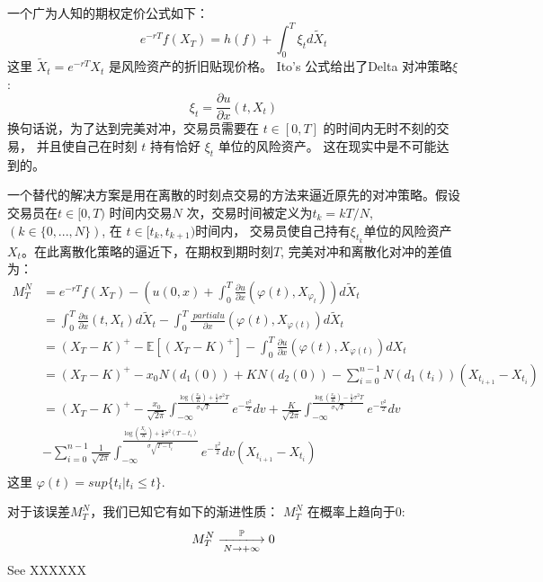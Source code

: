 一个广为人知的期权定价公式如下：
\begin{equation}
e^{-rT}f(X_T)=h(f)+\int_0^T \xi_t d\widetilde{X}_t
\end{equation}
这里 $\widetilde{X}_t=e^{-rT}X_t$ 是风险资产的折旧贴现价格。 
Ito's 公式给出了Delta 对冲策略$\xi$: 
\begin{equation}
\xi_t=\frac{\partial u}{\partial x}(t, X_t)
\end{equation}
换句话说，为了达到完美对冲，交易员需要在 
$t\in [0, T]$ 的时间内无时不刻的交易， 并且使自己在时刻 $t$ 持有恰好 $\xi_t$ 单位的风险资产。 
这在现实中是不可能达到的。

一个替代的解决方案是用在离散的时刻点交易的方法来逼近原先的对冲策略。假设交易员在$t\in[0, T)$
时间内交易$N$ 次，交易时间被定义为$t_k=kT/N$, $(k\in \{0,...,N\})$, 在 $t\in [t_k, t_{k+1})$时间内，
交易员使自己持有$\xi_{t_k}$单位的风险资产$X_t$。在此离散化策略的逼近下，在期权到期时刻$T$, 
完美对冲和离散化对冲的差值为：
\begin{equation}
\begin{split}
M_T^N
&=e^{-rT}f(X_T)-(u(0,x)+\int_0^T\frac{\partial u}{\partial x}(\varphi(t), 
X_{\varphi_t}))d\widetilde{X}_t\\
&=\int_0^T\frac{\partial u}{\partial x}(t, X_t)d\widetilde{X}_t-\int_0^T\frac{\    partial u}{\partial x}(\varphi(t), X_{\varphi(t)})d\widetilde{X}_t\\
&=(X_T-K)^+-\mathbb{E}[(X_T-K)^+]-\int_0^T\frac{\partial u}{\partial x}(\varphi(t), X_{\varphi(t)})dX_t\\
&=(X_T-K)^+-x_0N(d_1(0))+KN(d_2(0))-\sum_{i=0}^{n-1}N(d_1(t_i))(X_{t_{i+1}}-X_{t_i})\\
&=(X_T-K)^+-\frac{x_0}{\sqrt{2\pi}}\int_{-\infty}^{\frac{\log(\frac{x_0}{K})+\frac{1}{2}\sigma^2T}
{\sigma\sqrt{T}}}e^{-\frac{v^2}{2}}dv+\frac{K}{\sqrt{2\pi}}\int_{-\infty}^{\frac{\log(\frac{x_0}{K})-\frac{1}{2}\sigma^2T}{\sigma\sqrt{T}}}e^{-\frac{v^2}{2}}dv\\
&-\sum_{i=0}^{n-1}\frac{1}{\sqrt{2\pi}}\int_{-\infty}^{\frac{\log(\frac{X_{t_i}}{K})+\frac{1}{2}\sigma^2(T-t_i)}{\sigma\sqrt{T-t_i}}}e^{-\frac{v^2}{2}}dv(X_{t_{i+1}}-X_{t_i})\\
\end{split}
\end{equation}
这里 $\varphi(t)=sup\{t_i | t_i\leq t \}$.

对于该误差$M_T^N$，我们已知它有如下的渐进性质：
$M_T^N$ 在概率上趋向于0:
\begin{equation}
M_T^N\xlongrightarrow[N\rightarrow +\infty]{\mathbb{P}}0
\end{equation}
See XXXXXX

